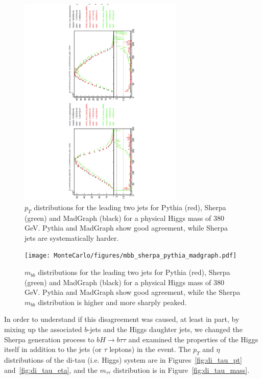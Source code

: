 \begin{figure}
  \center
  \includegraphics[width=0.7\textwidth, angle=270]{MonteCarlo/figures/sig_gen_compare.pdf}
  \caption{$p_T$ distributions for the leading two jets 
  for Pythia (red), Sherpa (green) and MadGraph (black) for a 
  physical Higgs mass of 380 GeV.  
  Pythia and MadGraph show good agreement, while Sherpa jets are systematically harder.  \label{fig:sig_gen_compare}}
\end{figure}
\begin{figure}
  \center
  \texttt{[image: MonteCarlo/figures/mbb\_sherpa\_pythia\_madgraph.pdf]}
  \caption{$m_{bb}$ distributions for the leading two jets 
  for Pythia (red), Sherpa (green) and MadGraph (black) for a physical Higgs mass of 380 GeV.  
  Pythia and MadGraph show good agreement, while the Sherpa $m_{bb}$ distribution is higher and more sharply peaked. \label{fig:mbb_sherpa_pythia_madgraph}}
\end{figure}

In order to understand if this disagreement was caused, at least in part, by
mixing up the associated $b$-jets and the Higgs daughter jets, we changed the Sherpa
generation process to $bH\rightarrow b\tau\tau$ and examined the properties of the
Higgs itself in addition to the jets (or $\tau$ leptons) in the event.  The $p_T$ and 
$\eta$ distributions of the di-tau (i.e. Higgs) system are in Figures~\ref{fig:di_tau_pt}
and~\ref{fig:di_tau_eta}, and the $m_{\tau\tau}$ distribution is in Figure~\ref{fig:di_tau_mass}.



